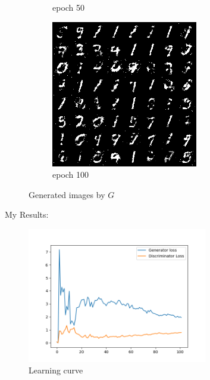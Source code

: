 \documentclass[a4paper]{article}
\theoremstyle{definition}
\newenvironment{soln}{
	\leavevmode\color{blue}\ignorespaces
}{}
\begin{document}
\begin{enumerate} [label=(\alph*)]
\begin{figure}[H]
\begin{subfigure}[b]{0.3\textwidth}
				\caption{epoch 50}
			\end{subfigure}
			\hfill
			\begin{subfigure}[b]{0.3\textwidth}
				\centering
				\includegraphics[width=\textwidth]{gan_q1_epoch100.png}
				\caption{epoch 100}
			\end{subfigure}
			\caption{Generated images by $G$}
			\label{fig:three graphs}
		\end{figure}
		
		\newpage
		\begin{soln}
        My Results:
        \begin{figure}[H]
			\centering
			\includegraphics[width=0.7\textwidth]{images/q1a_loss.png}
			\caption{Learning curve}
			\label{fig:gan_q1_loss}
		\end{figure}
		

\end{soln}
\end{enumerate}
\end{document}
